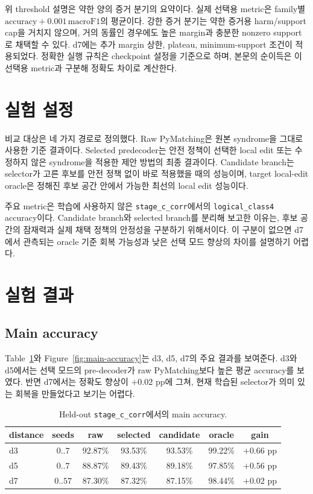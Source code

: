 \documentclass[aps,prd,12pt,twocolumn,superscriptaddress,floatfix,longbibliography]{revtex4-2}
\newcommand{\thesiscaptionfont}{\footnotesize}
\begin{document}
위 threshold 설명은 약한 양의 증거 분기의 요약이다. 실제 선택용 metric은
family별 \(\mathrm{accuracy}+0.001\,\mathrm{macroF1}\)의 평균이다.
강한 증거 분기는 약한 증거용 harm/support cap을 거치지 않으며, 거의 동률인
경우에도 높은 margin과 충분한 nonzero support로 채택할 수 있다.
d7에는 추가 margin 상한, plateau, minimum-support 조건이 적용되었다.
정확한 실행 규칙은 checkpoint 설정을 기준으로 하며, 본문의 순이득은 이 선택용
metric과 구분해 정확도 차이로 계산한다.

\section{실험 설정}

비교 대상은 네 가지 경로로 정의했다. Raw PyMatching은 원본 syndrome을 그대로
사용한 기준 결과이다. Selected predecoder는 안전 정책이 선택한 local edit 또는
수정하지 않은 syndrome을 적용한 제안 방법의 최종 결과이다. Candidate branch는
selector가 고른 후보를 안전 정책 없이 바로 적용했을 때의 성능이며, target
local-edit oracle은 정해진 후보 공간 안에서 가능한 최선의 local edit 성능이다.

주요 metric은 학습에 사용하지 않은 \texttt{stage\_c\_corr}에서의
\texttt{logical\_class4} accuracy이다. Candidate branch와 selected branch를
분리해 보고한 이유는, 후보 공간의 잠재력과 실제 채택 정책의 안정성을 구분하기
위해서이다. 이 구분이 없으면 d7에서 관측되는 oracle 기준 회복 가능성과 낮은
선택 모드 향상의 차이를 설명하기 어렵다.

\section{실험 결과}

\subsection{Main accuracy}

Table~\ref{tab:main-results}와 Figure~\ref{fig:main-accuracy}는 d3, d5, d7의
주요 결과를 보여준다. d3와 d5에서는 선택 모드의 pre-decoder가 raw PyMatching보다
높은 평균 accuracy를 보였다. 반면 d7에서는 정확도 향상이 \(+0.02\) pp에 그쳐,
현재 학습된 selector가 의미 있는 회복을 만들었다고 보기는 어렵다.

\begin{table}[!tbp]
\caption{\thesiscaptionfont Held-out \texttt{stage\_c\_corr}에서의 main accuracy.}
\label{tab:main-results}
\centering
\scriptsize
\begin{tabular*}{\textwidth}{@{\extracolsep{\fill}}lcccccc}
\toprule
distance & seeds & raw & selected & candidate & oracle & gain \\
\midrule
d3 & \(0..7\) & 92.87\% & 93.53\% & 93.53\% & 99.22\% & \(+0.66\) pp \\
d5 & \(0..7\) & 88.87\% & 89.43\% & 89.18\% & 97.85\% & \(+0.56\) pp \\
d7 & \(0..57\) & 87.30\% & 87.32\% & 87.15\% & 98.44\% & \(+0.02\) pp \\
\bottomrule
\end{tabular*}
\end{table}
\end{document}
